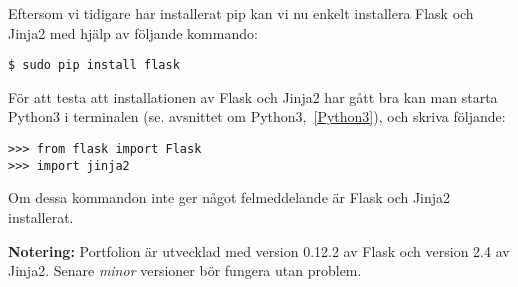 \documentclass{TDP003mall}
\begin{document}
Eftersom vi tidigare har installerat pip kan vi nu enkelt installera Flask och Jinja2 med hjälp av följande kommando:

\verb|$ sudo pip install flask|

För att testa att installationen av Flask och Jinja2 har gått bra kan man starta Python3 i terminalen (se. avsnittet om Python3,~\ref{Python3}), och skriva följande:

\verb|>>> from flask import Flask|\\
\verb|>>> import jinja2|

Om dessa kommandon inte ger något felmeddelande är Flask och Jinja2 installerat.

\textbf{Notering:} Portfolion är utvecklad med version 0.12.2 av Flask och version 2.4 av Jinja2. Senare \textit{minor} versioner bör fungera utan problem.
\end{document}
